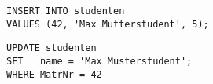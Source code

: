 \begin{normalText}
\begin{enumerate}[a)]
\cprotEnv
	\begin{note}
	\begin{lstlisting}
INSERT INTO studenten
VALUES (42, 'Max Mutterstudent', 5);
	\end{lstlisting}

	\begin{lstlisting}
UPDATE studenten
SET   name = 'Max Musterstudent';
WHERE MatrNr = 42
	\end{lstlisting}
	\end{note}

\end{enumerate}
\end{normalText}
